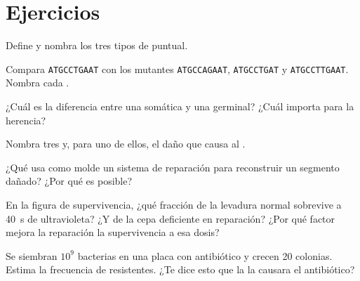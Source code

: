 \section{Ejercicios}

\begin{exercise}[$\star$]\label{exo:g11:mutations:1}
Define  y nombra los tres tipos de  puntual.
\end{exercise}

\begin{exercise}[$\star$]\label{exo:g11:mutations:2}
Compara \texttt{ATGCCTGAAT} con los mutantes \texttt{ATGCCAGAAT},
\texttt{ATGCCTGAT} y \texttt{ATGCCTTGAAT}. Nombra cada .
\end{exercise}

\begin{exercise}[$\star$]\label{exo:g11:mutations:3}
¿Cuál es la diferencia entre una  somática y una germinal?
¿Cuál importa para la herencia?
\end{exercise}

\begin{exercise}[$\star$]\label{exo:g11:mutations:4}
Nombra tres  y, para uno de ellos, el daño que causa al .
\end{exercise}

\begin{exercise}[$\star$]\label{exo:g11:mutations:5}
¿Qué usa como molde un sistema de reparación para reconstruir un
segmento dañado? ¿Por qué es posible?
\end{exercise}

\begin{exercise}[$\star\star$]\label{exo:g11:mutations:6}
En la figura de supervivencia, ¿qué fracción de la levadura normal
sobrevive a \qty{40}{s} de ultravioleta? ¿Y de la cepa deficiente en
reparación? ¿Por qué factor mejora la reparación la supervivencia a esa
dosis?
\end{exercise}

\begin{exercise}[$\star\star$]\label{exo:g11:mutations:7}
Se siembran $10^9$ bacterias en una placa con antibiótico y crecen 20
colonias. Estima la frecuencia de  resistentes. ¿Te dice esto
que la  la causara el antibiótico?
\end{exercise}

